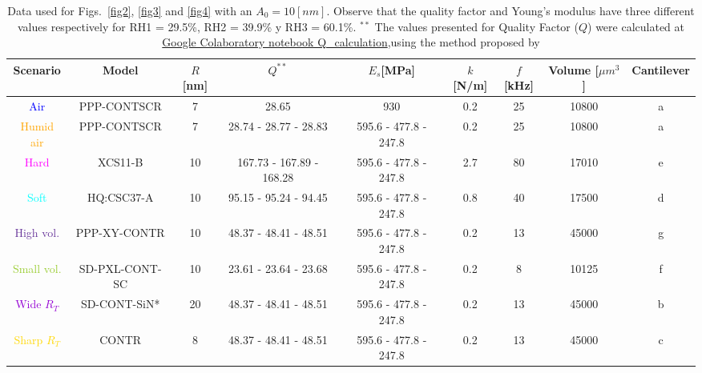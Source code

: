 \documentclass[letterpaper,compsoc,twoside]{IEEEtran}
\begin{document}
\renewcommand{\tablename}{Tabla}
\begin{table}[ht]
\caption{Data used for Figs.~\ref{fig2}, \ref{fig3} and \ref{fig4} with an $A_0 = 10 [nm]$. Observe that the quality factor and Young's modulus have three different values respectively for RH1 = 29.5\%, RH2 = 39.9\% y RH3 = 60.1\%. $^{**}$ The values presented for Quality Factor ($Q$) were calculated at  \href{https://colab.research.google.com/drive/1O1xjLfmMoL6J4EwVods95zfelzr8GDUQ?usp=sharing}{Google Colaboratory notebook Q\_calculation},using the method proposed by \cite{Sader, Sader2}}
\centering
\begin{tabular}{ c  c  c  c  c  c  c  c  c }
\hline
Scenario  & Model & $R$[nm] & $Q^{**}$ & $E_s$[MPa] & $k$[N/m] & $f$[kHz] & Volume [$\mu m^3$] & Cantilever\\ \hline
\textcolor{blue}{Air} & PPP-CONTSCR & 7 & 28.65 & 930 & 0.2 & 25 & 10800 & a\\
\textcolor{orange}{Humid air}& PPP-CONTSCR & 7 & 28.74 - 28.77 - 28.83 & 595.6 - 477.8 - 247.8 & 0.2 & 25 & 10800 &a \\
\textcolor{magenta}{Hard} & XCS11-B & 10 & 167.73 - 167.89 - 168.28 & 595.6 - 477.8 - 247.8 & 2.7 & 80 & 17010 & e \\
\textcolor{cyan}{Soft} & HQ:CSC37-A & 10 & 95.15 - 95.24 - 94.45 & 595.6 - 477.8 - 247.8 & 0.8 & 40 & 17500 & d \\
\textcolor{rebeccapurple}{High vol.} & PPP-XY-CONTR & 10 & 48.37 - 48.41 - 48.51 & 595.6 - 477.8 - 247.8 & 0.2 & 13 & 45000 & g \\
\textcolor{yellowgreen}{Small vol.} & SD-PXL-CONT-SC & 10 & 23.61 - 23.64 - 23.68 & 595.6 - 477.8 - 247.8 & 0.2 & 8 & 10125 & f \\
\textcolor{darkviolet}{Wide $R_T$} & SD-CONT-SiN* & 20 & 48.37 - 48.41 - 48.51 & 595.6 - 477.8 - 247.8 & 0.2 & 13 & 45000 & b \\
\textcolor{gold}{Sharp $R_T$} & CONTR & 8 & 48.37 - 48.41 - 48.51 & 595.6 - 477.8 - 247.8 & 0.2 & 13 & 45000 & c \\ \hline
\end{tabular}
\label{tab:compare}
\end{table}
\end{document}
